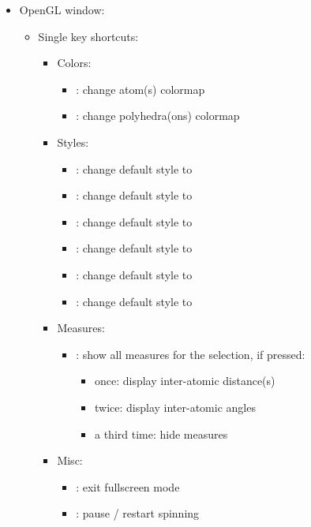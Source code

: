 {\begin{itemize}
\begin{itemize}
\item[] \Ctrl +  : Open the data plot editing tool box [Fig.~\ref{edittool}]
\item[] \Ctrl +  : Export image
\item[] \Ctrl +  : Save / export data
\end{itemize}
\item OpenGL window:
\begin{itemize}
\item Single key shortcuts:
\begin{itemize}
\item Colors: 
\begin{itemize}
\item[]  : change atom(s) colormap
\item[]  : change polyhedra(ons) colormap
\end{itemize}
\item Styles:
\begin{itemize}
\item[]  : change default style to   
\item[]  : change default style to 
\item[]  : change default style to  
\item[]  : change default style to  
\item[]  : change default style to 
\item[]  : change default style to 
\end{itemize}
\item Measures:
\begin{itemize}
\item[]  : show all measures for the selection, if pressed: 
\begin{itemize}
\item once: display inter-atomic distance(s)
\item twice: display inter-atomic angles
\item a third time: hide measures
\end{itemize}
\end{itemize}
\item Misc: 
\begin{itemize}
\item[] \Esc : exit fullscreen mode
\item[] \Spacebar : pause / restart spinning

\end{itemize}
\end{itemize}
\end{itemize}
\end{itemize}}

